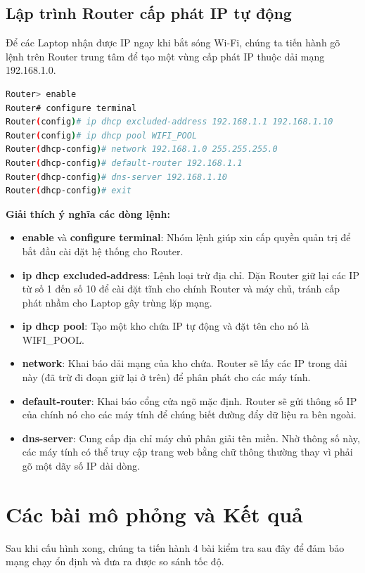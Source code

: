 \documentclass[a4paper, 12pt]{article}
\begin{document}
\subsection{Lập trình Router cấp phát IP tự động}
Để các Laptop nhận được IP ngay khi bắt sóng Wi-Fi, chúng ta tiến hành gõ lệnh trên Router trung tâm để tạo một vùng cấp phát IP thuộc dải mạng 192.168.1.0.

\begin{lstlisting}[language=bash, caption=Lệnh cấu hình DHCP trên Router]
Router> enable
Router# configure terminal
Router(config)# ip dhcp excluded-address 192.168.1.1 192.168.1.10
Router(config)# ip dhcp pool WIFI_POOL
Router(dhcp-config)# network 192.168.1.0 255.255.255.0
Router(dhcp-config)# default-router 192.168.1.1
Router(dhcp-config)# dns-server 192.168.1.10
Router(dhcp-config)# exit
\end{lstlisting}

\textbf{Giải thích ý nghĩa các dòng lệnh:}
\begin{itemize}
    \item \textbf{enable} và \textbf{configure terminal}: Nhóm lệnh giúp xin cấp quyền quản trị để bắt đầu cài đặt hệ thống cho Router.
    \item \textbf{ip dhcp excluded-address}: Lệnh loại trừ địa chỉ. Dặn Router giữ lại các IP từ số 1 đến số 10 để cài đặt tĩnh cho chính Router và máy chủ, tránh cấp phát nhầm cho Laptop gây trùng lặp mạng.
    \item \textbf{ip dhcp pool}: Tạo một kho chứa IP tự động và đặt tên cho nó là WIFI\_POOL.
    \item \textbf{network}: Khai báo dải mạng của kho chứa. Router sẽ lấy các IP trong dải này (đã trừ đi đoạn giữ lại ở trên) để phân phát cho các máy tính.
    \item \textbf{default-router}: Khai báo cổng cửa ngõ mặc định. Router sẽ gửi thông số IP của chính nó cho các máy tính để chúng biết đường đẩy dữ liệu ra bên ngoài.
    \item \textbf{dns-server}: Cung cấp địa chỉ máy chủ phân giải tên miền. Nhờ thông số này, các máy tính có thể truy cập trang web bằng chữ thông thường thay vì phải gõ một dãy số IP dài dòng.
\end{itemize}

\section{Các bài mô phỏng và Kết quả}

Sau khi cấu hình xong, chúng ta tiến hành 4 bài kiểm tra sau đây để đảm bảo mạng chạy ổn định và đưa ra được so sánh tốc độ.
\end{document}
